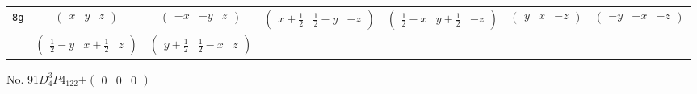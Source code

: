 \documentclass[fleqn,9pt,landscape]{jsarticle}
\begin{document}
\begin{center}
\begin{longtable}{ccccccc}
{\tt 8g} & $ \begin{pmatrix} x & y & z \end{pmatrix} $ & $ \begin{pmatrix} - x & - y & z \end{pmatrix} $ & $ \begin{pmatrix} x + \frac{1}{2} & \frac{1}{2} - y & - z \end{pmatrix} $ & $ \begin{pmatrix} \frac{1}{2} - x & y + \frac{1}{2} & - z \end{pmatrix} $ & $ \begin{pmatrix} y & x & - z \end{pmatrix} $ & $ \begin{pmatrix} - y & - x & - z \end{pmatrix} $ \\
& $ \begin{pmatrix} \frac{1}{2} - y & x + \frac{1}{2} & z \end{pmatrix} $ & $ \begin{pmatrix} y + \frac{1}{2} & \frac{1}{2} - x & z \end{pmatrix} $ & $  $ & $  $ & $  $ & $  $ \\
\end{longtable}
\end{center}
\newpage
No. 91\quad$D_{4}^{3}$\quad$P4_122$\quad[ tetragonal ]\quad$+\begin{pmatrix} 0 & 0 & 0 \end{pmatrix}$
\end{document}

